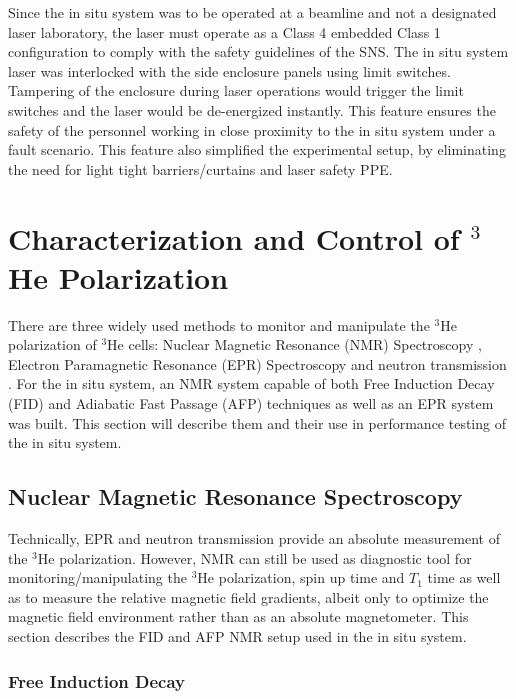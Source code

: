 Since the in situ system was to be operated at a beamline and not a designated laser laboratory, the laser must operate as a Class 4 embedded Class 1 configuration to comply with the safety guidelines of the SNS. The in situ system laser was interlocked with the side enclosure panels using limit switches. Tampering of the enclosure during laser operations would trigger the limit switches and the laser would be de-energized instantly. This feature ensures the safety of the personnel working in close proximity to the in situ system under a fault scenario. This feature also simplified the experimental setup, by eliminating the need for light tight barriers/curtains and laser safety PPE.


\section{Characterization and Control of $^{3}$He Polarization}

There are three widely used methods to monitor and manipulate the $^3$He polarization of $^3$He cells: Nuclear Magnetic Resonance (NMR) Spectroscopy \cite{Lorenzon1993, Romalis1998}, Electron Paramagnetic Resonance (EPR) Spectroscopy \cite{Romalis1998, Babcock2005} and neutron transmission \cite{Jones2000, Chupp2007}. For the in situ system, an NMR system capable of both Free Induction Decay (FID) and Adiabatic Fast Passage (AFP) techniques as well as an EPR system was built. This section will describe them and their use in performance testing of the in situ system.

\subsection{Nuclear Magnetic Resonance Spectroscopy}

Technically, EPR and neutron transmission provide an absolute measurement of the $^3$He polarization. However, NMR can still be used as diagnostic tool for monitoring/manipulating the $^3$He polarization, spin up time and $T_1$ time as well as to measure the relative magnetic field gradients, albeit only to optimize the magnetic field environment rather than as an absolute magnetometer. This section describes the FID and AFP NMR setup used in the in situ system.

\subsubsection{Free Induction Decay}

